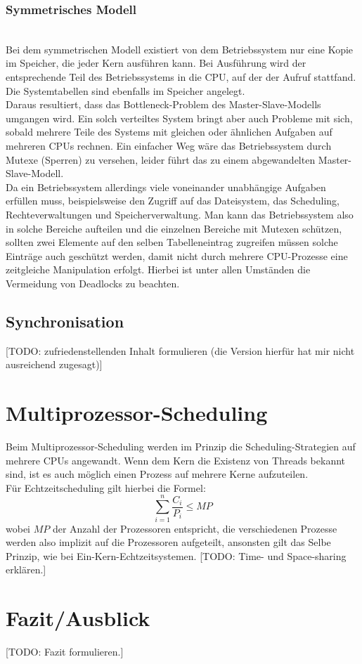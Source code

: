 \subsubsection{Symmetrisches Modell} \quad \\
Bei dem symmetrischen Modell existiert von dem Betriebssystem nur eine Kopie im Speicher, die jeder Kern ausführen kann. Bei Ausführung wird der entsprechende Teil des Betriebssystems in die CPU, auf der der Aufruf stattfand. \cite{tanenb2009} Die Systemtabellen sind ebenfalls im Speicher angelegt. \\
Daraus resultiert, dass das Bottleneck-Problem des Master-Slave-Modells umgangen wird. Ein solch verteiltes System bringt aber auch Probleme mit sich, sobald mehrere Teile des Systems mit gleichen oder ähnlichen Aufgaben auf mehreren CPUs rechnen. Ein einfacher Weg wäre das Betriebssystem durch Mutexe (Sperren) zu versehen, leider führt das zu einem abgewandelten Master-Slave-Modell. \\
Da ein Betriebssystem allerdings viele voneinander unabhängige Aufgaben erfüllen muss, beispielsweise den Zugriff auf das Dateisystem, das Scheduling, Rechteverwaltungen und  Speicherverwaltung. Man kann das Betriebssystem also in solche Bereiche aufteilen und die einzelnen Bereiche mit Mutexen schützen, sollten zwei Elemente auf den selben Tabelleneintrag zugreifen müssen solche Einträge auch geschützt werden, damit nicht durch mehrere CPU-Prozesse eine zeitgleiche Manipulation erfolgt. Hierbei ist unter allen Umständen die Vermeidung von Deadlocks zu beachten. \\

\subsection{Synchronisation}
[TODO: zufriedenstellenden Inhalt formulieren (die Version hierfür hat mir nicht ausreichend zugesagt)]

\section{Multiprozessor-Scheduling}
Beim Multiprozessor-Scheduling werden im Prinzip die Scheduling-Strategien auf mehrere CPUs angewandt. Wenn dem Kern die Existenz von Threads bekannt sind, ist es auch möglich einen Prozess auf mehrere Kerne aufzuteilen. \\
Für Echtzeitscheduling gilt hierbei die Formel: \[\sum\limits_{i=1}^{n}\frac{C_i}{P_i} \leq MP\] wobei \(MP\) der Anzahl der Prozessoren entspricht, die verschiedenen Prozesse werden also implizit auf die Prozessoren aufgeteilt, ansonsten gilt das Selbe Prinzip, wie bei Ein-Kern-Echtzeitsystemen.
[TODO: Time- und Space-sharing erklären.]

\section{Fazit/Ausblick}
[TODO: Fazit formulieren.]

\pagebreak
\nocite{*}
